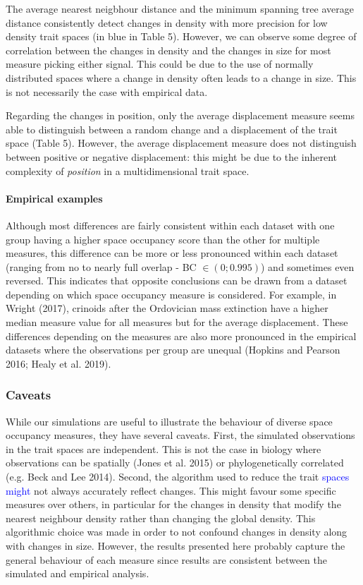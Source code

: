 \documentclass[]{article}
\let\oldparagraph\paragraph
\renewcommand{\paragraph}[1]{\oldparagraph{#1}\mbox{}}
\begin{document}
The average nearest neigbhour distance and the minimum spanning tree
average distance consistently detect changes in density with more
precision for low density trait spaces (in blue in Table 5). However, we
can observe some degree of correlation between the changes in density
and the changes in size for most measure picking either signal. This
could be due to the use of normally distributed spaces where a change in
density often leads to a change in size. This is not necessarily the
case with empirical data.

Regarding the changes in position, only the average displacement measure
seems able to distinguish between a random change and a displacement of
the trait space (Table 5). However, the average displacement measure
does not distinguish between positive or negative displacement: this
might be due to the inherent complexity of \emph{position} in a
multidimensional trait space.

\paragraph{Empirical examples}\label{empirical-examples-1}

Although most differences are fairly consistent within each dataset with
one group having a higher space occupancy score than the other for
multiple measures, this difference can be more or less pronounced within
each dataset (ranging from no to nearly full overlap - BC
\(\in(0;0.995)\)) and sometimes even reversed. This indicates that
opposite conclusions can be drawn from a dataset depending on which
space occupancy measure is considered. For example, in Wright (2017),
crinoids after the Ordovician mass extinction have a higher median
measure value for all measures but for the average displacement. These
differences depending on the measures are also more pronounced in the
empirical datasets where the observations per group are unequal (Hopkins
and Pearson 2016; Healy et al. 2019).

\subsubsection{Caveats}\label{caveats}

While our simulations are useful to illustrate the behaviour of diverse
space occupancy measures, they have several caveats. First, the
simulated observations in the trait spaces are independent. This is not
the case in biology where observations can be spatially (Jones et al.
2015) or phylogenetically correlated (e.g. Beck and Lee 2014). Second,
the algorithm used to reduce the trait
\textcolor{blue}{ spaces might } not always
accurately reflect changes. This might favour some specific measures
over others, in particular for the changes in density that modify the
nearest neighbour density rather than changing the global density. This
algorithmic choice was made in order to not confound changes in density
along with changes in size. However, the results presented here probably
capture the general behaviour of each measure since results are
consistent between the simulated and empirical analysis.
\end{document}
